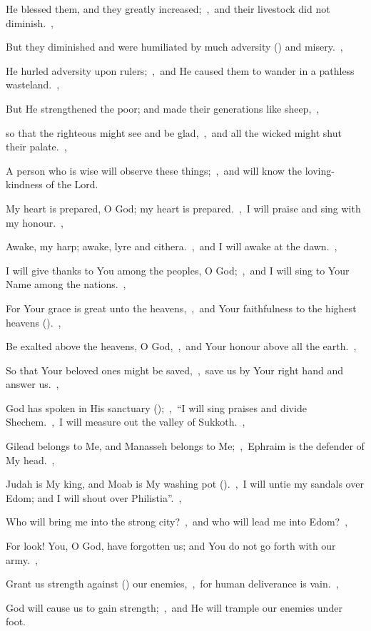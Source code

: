 \documentclass[12pt,twoside,a5paper]{article}
\begin{document}
\begin{normalparskip}
  He blessed them, and they greatly increased;~\sep\ and their livestock did not diminish.~\sep

  But they diminished and were humiliated by much adversity () and misery.~\sep

  He hurled adversity upon rulers;~\sep\ and He caused them to wander in a pathless wasteland.~\sep

  But He strengthened the poor; and made their generations like sheep,~\sep

  so that the righteous might see and be glad,~\sep\ and all the wicked might shut their palate.~\sep

  A person who is wise will observe these things;~\sep\ and will know the loving-kindness of the Lord.
\end{normalparskip}


\begin{normalparskip}
  My heart is prepared, O God; my heart is prepared.~\sep\ I will praise and sing with my honour.~\sep


  Awake, my harp; awake, lyre and cithera.~\sep\ and I will awake at the dawn.~\sep

  I will give thanks to You among the peoples, O God;~\sep\ and I will sing to Your Name among the nations.~\sep

  For Your grace is great unto the heavens,~\sep\ and Your faithfulness to the highest heavens ().~\sep

  Be exalted above the heavens, O God,~\sep\ and Your honour above all the earth.~\sep

  So that Your beloved ones might be saved,~\sep\ save us by Your right hand and answer us.~\sep

  God has spoken in His sanctuary ();~\sep\ ``I will sing praises and divide Shechem.~\sep\ I will measure out the valley of Sukkoth.~\sep

  Gilead belongs to Me, and Manasseh belongs to Me;~\sep\ Ephraim is the defender of My head.~\sep

  Judah is My king, and Moab is My washing pot ().~\sep\ I will untie my sandals over Edom; and I will shout over Philistia''.~\sep

  Who will bring me into the strong city?~\sep\ and who will lead me into Edom?~\sep

  For look! You, O God, have forgotten us; and You do not go forth with our army.~\sep

  Grant us strength against () our enemies,~\sep\ for human deliverance is vain.~\sep

  God will cause us to gain strength;~\sep\ and He will trample our enemies under foot.
\end{normalparskip}
\end{document}
